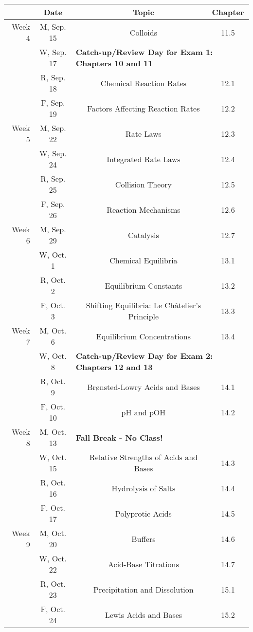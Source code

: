 \documentclass[12pt, letterpaper]{article}
\begin{document}
\begin{tabular}{rcccc}
& Date && Topic & Chapter\\
\midrule
Week 4 & M, Sep. 15&& Colloids & 11.5\\
& W, Sep. 17& \multicolumn{3}{l}{\textbf{Catch-up/Review Day for Exam 1: Chapters 10 and 11}}\\
& R, Sep. 18&& Chemical Reaction Rates & 12.1\\
& F, Sep. 19&& Factors Affecting Reaction Rates & 12.2\\
\midrule
Week 5 & M, Sep. 22&& Rate Laws & 12.3\\
& W, Sep. 24&& Integrated Rate Laws & 12.4\\
& R, Sep. 25&& Collision Theory & 12.5\\
& F, Sep. 26&& Reaction Mechanisms & 12.6\\
\midrule
Week 6 & M, Sep. 29&& Catalysis & 12.7\\
& W, Oct. 1&& Chemical Equilibria & 13.1\\
& R, Oct. 2&& Equilibrium Constants & 13.2\\
& F, Oct. 3&& Shifting Equilibria: Le Ch\^atelier's Principle & 13.3\\
\midrule
Week 7 & M, Oct. 6&& Equilibrium Concentrations & 13.4\\
& W, Oct. 8& \multicolumn{3}{l}{\textbf{Catch-up/Review Day for Exam 2: Chapters 12 and 13}}\\
& R, Oct. 9&& Brønsted-Lowry Acids and Bases & 14.1\\
& F, Oct. 10&& pH and pOH & 14.2\\
\midrule
Week 8 & M, Oct. 13& \multicolumn{3}{l}{\textbf{Fall Break - No Class!}}\\
& W, Oct. 15&& Relative Strengths of Acids and Bases & 14.3\\
& R, Oct. 16&& Hydrolysis of Salts & 14.4\\
& F, Oct. 17&& Polyprotic Acids & 14.5\\
\midrule
Week 9 & M, Oct. 20&& Buffers & 14.6\\
& W, Oct. 22&& Acid-Base Titrations & 14.7\\
& R, Oct. 23&& Precipitation and Dissolution & 15.1\\
& F, Oct. 24&& Lewis Acids and Bases & 15.2\\
\end{tabular}
\end{document}
